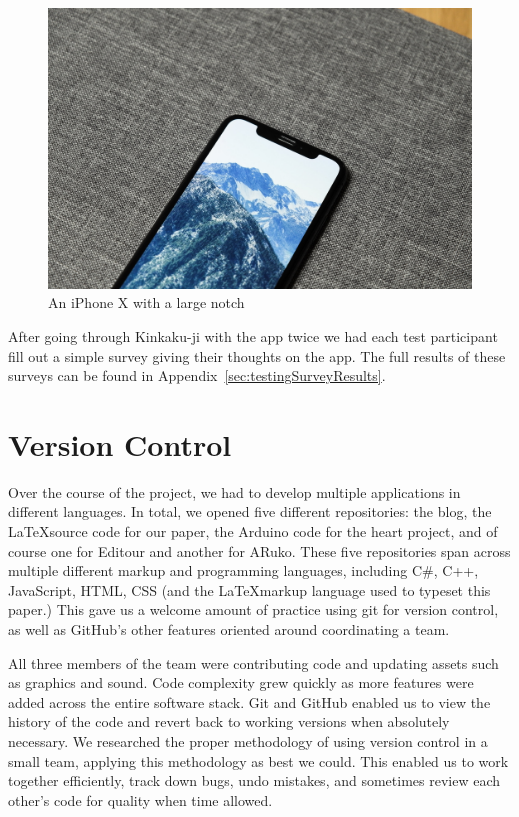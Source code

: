 \documentclass[a4paper, 10pt, american, titlepage]{article}
\begin{document}
\begin{figure}[h]
	\centering
	\includegraphics[width=\textwidth]{iphone-x.jpg}
	\caption[An iPhone X with a large notch]{An iPhone X with a large
		notch~\autocite{yoo2017}}
	\label{fig:iPhoneX}
\end{figure}

After going through Kinkaku-ji with the app twice we had each test participant
fill out a simple survey giving their thoughts on the app. The full results of
these surveys can be found in Appendix~\ref{sec:testingSurveyResults}.

\section{Version Control}
\label{sec:versionControl}

Over the course of the project, we had to develop multiple applications in
different languages. In total, we opened five different repositories: the blog,
the \LaTeX source code for our paper, the Arduino code for the heart project,
and of course one for Editour and another for ARuko. These five repositories
span across multiple different markup and programming languages, including C\#,
C++, JavaScript, HTML, CSS (and the \LaTeX markup language used to typeset this
paper.) This gave us a welcome amount of practice using git for version control,
as well as GitHub's other features oriented around coordinating a team.

All three members of the team were contributing code and updating assets such as
graphics and sound. Code complexity grew quickly as more features were added
across the entire software stack. Git and GitHub enabled us to view the history
of the code and revert back to working versions when absolutely necessary. We
researched the proper methodology of using version control in a small team,
applying this methodology as best we could. This enabled us to work together
efficiently, track down bugs, undo mistakes, and sometimes review each other's
code for quality when time allowed.
\end{document}
